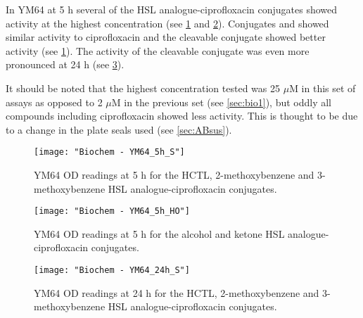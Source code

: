 

In YM64 at 5 h several of the HSL analogue-ciprofloxacin conjugates showed activity at the highest concentration (see \ref{fgr:YM64_5h_S} and \ref{fgr:YM64_5h_HO}). 
Conjugates  and  showed similar activity to ciprofloxacin  and the cleavable conjugate
 showed better activity (see \ref{fgr:YM64_5h_S}).
The activity of the cleavable conjugate  was even more pronounced at 24 h (see \ref{fgr:YM64_24h_S}).

It should be noted that the highest concentration tested was 25 $\mu$M in this set of assays as opposed to 2 $\mu$M in the previous set (see \ref{sec:bio1}), but oddly all compounds including ciprofloxacin  showed less activity. This is thought to be due to a change in the plate seals used (see \ref{sec:ABsus}). 


\begin{figure}[H]
	\begin{center}
		\texttt{[image: "Biochem - YM64\_5h\_S"]}
		\caption{YM64 OD readings at 5 h for the HCTL, 2-methoxybenzene and 3-methoxybenzene HSL analogue-ciprofloxacin conjugates.\label{fgr:YM64_5h_S}}
	\end{center}
\end{figure}

\begin{figure}[H]
	\begin{center}
		\texttt{[image: "Biochem - YM64\_5h\_HO"]}
		\caption{YM64 OD readings at 5 h for the alcohol and ketone HSL analogue-ciprofloxacin conjugates.\label{fgr:YM64_5h_HO}}
	\end{center}
\end{figure}

\begin{figure}[H]
	\begin{center}
		\texttt{[image: "Biochem - YM64\_24h\_S"]}
		\caption{YM64 OD readings at 24 h for the HCTL, 2-methoxybenzene and 3-methoxybenzene HSL analogue-ciprofloxacin conjugates.\label{fgr:YM64_24h_S}}
	\end{center}
\end{figure}

